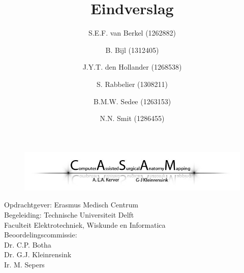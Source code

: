 \documentclass[12pt, a4paper]{article}
\title{\casamproject Eindverslag}
\author{S.E.F. van Berkel (1262882) \and B. Bijl (1312405)\and J.Y.T. den Hollander (1268538)\and S. Rabbelier (1308211)\and B.M.W. Sedee (1263153)\and N.N. Smit (1286455)}
\begin{document}
\begin{titlepage}

\begin{figure}[t]
\includegraphics[width=\textwidth]{banner}
\nonumber
\end{figure}

\maketitle

\thispagestyle{empty}

\begin{center}
\vspace{2cm}
\large
Opdrachtgever: Erasmus Medisch Centrum \\
Begeleiding: Technische Universiteit Delft\\
Faculteit Elektrotechniek, Wiskunde en Informatica\\

\vspace{4cm}
Beoordelingscommissie: \\
Dr. C.P. Botha \\
Dr. G.J. Kleinrensink \\
Ir. M. Sepers

\end{center}

\end{titlepage}
\newpage
\thispagestyle{empty}
\mbox{}
\newpage
\thispagestyle{empty}

\newpage

\setcounter{tocdepth}{3}

\setcounter{page}{1}
\tableofcontents

\newpage
\noindent
{}
\setcounter{page}{2}


\newpage

\newpage

\newpage

\newpage

\newpage

\newpage

\newpage

\newpage




\newpage


\newpage

\end{document}
